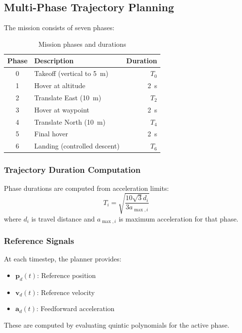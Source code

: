 \documentclass[12pt,a4paper]{article}
\begin{document}
\subsection{Multi-Phase Trajectory Planning}

The mission consists of seven phases:

\begin{table}[h]
\centering
\caption{Mission phases and durations}
\begin{tabular}{clr}
\toprule
Phase & Description & Duration \\
\midrule
0 & Takeoff (vertical to \SI{5}{m}) & $T_0$ \\
1 & Hover at altitude & \SI{2}{s} \\
2 & Translate East (\SI{10}{m}) & $T_2$ \\
3 & Hover at waypoint & \SI{2}{s} \\
4 & Translate North (\SI{10}{m}) & $T_4$ \\
5 & Final hover & \SI{2}{s} \\
6 & Landing (controlled descent) & $T_6$ \\
\bottomrule
\end{tabular}
\label{tab:phases}
\end{table}

\subsubsection{Trajectory Duration Computation}
Phase durations are computed from acceleration limits:
\begin{equation}
    T_i = \sqrt{\frac{10\sqrt{3}d_i}{3a_{\max,i}}}
    \label{eq:phase_duration}
\end{equation}
where $d_i$ is travel distance and $a_{\max,i}$ is maximum acceleration for that phase.

\subsubsection{Reference Signals}
At each timestep, the planner provides:
\begin{itemize}
    \item $\mathbf{p}_d(t)$: Reference position
    \item $\mathbf{v}_d(t)$: Reference velocity
    \item $\mathbf{a}_d(t)$: Feedforward acceleration
\end{itemize}

These are computed by evaluating quintic polynomials for the active phase.
\end{document}
